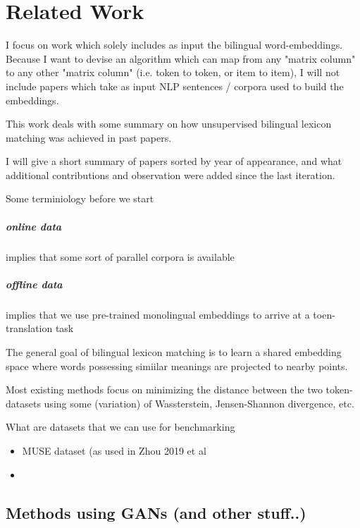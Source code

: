 \documentclass[a4paper,12pt,twoside,openright]{report}
\begin{document}
\chapter{Related Work}

I focus on work which solely includes as input the bilingual word-embeddings.
Because I want to devise an algorithm which can map from any "matrix column" to any other "matrix column" (i.e. token to token, or item to item), I will not include papers which take as input NLP sentences / corpora used to build the embeddings. 

This work deals with some summary on how unsupervised bilingual lexicon matching was achieved in past papers.

I will give a short summary of papers sorted by year of appearance, and what additional contributions and observation were added since the last iteration.

Some terminiology before we start

\paragraph{online data} implies that some sort of parallel corpora is available
\paragraph{offline data} implies that we use pre-trained monolingual embeddings to arrive at a toen-translation task

The general goal of bilingual lexicon matching is to learn a shared embedding space where words possessing simiilar meanings are projected to nearby points.

Most existing methods focus on minimizing the distance between the two token-datasets using some (variation) of Wassterstein, Jensen-Shannon divergence, etc.

What are datasets that we can use for benchmarking

\begin{itemize}
\item MUSE dataset (as used in Zhou 2019 et al
\item 
\end{itemize}

\section{Methods using GANs (and other stuff..)}
\end{document}

